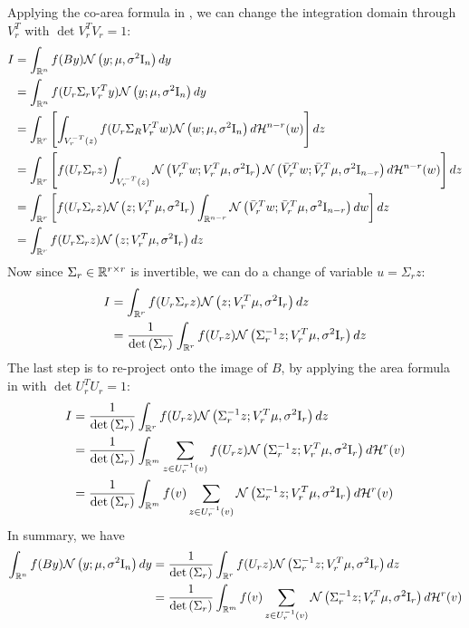 \documentclass[a4paper,10pt]{article}
\begin{document}
Applying the co-area formula in , we can change the integration domain through $V_r^T$ with $\det{V_r^T V_r} = 1$: 
\begin{align*}
    I &= \int_{\mathbb{R}^n} f(B y) \mathcal{N}\left( {y; \mu, \sigma^2 \mathrm{I}_n} \right) dy 
    \\&= \int_{\mathbb{R}^n} f(U_r \Sigma_r V_r^T y) \mathcal{N}\left( {y; \mu, \sigma^2 \mathrm{I}_n} \right) dy 
    \\&= \int_{\mathbb{R}^r} \left[ \int_{V_r^{-T}(z)} f(U_r \Sigma_R V_r^T w) \mathcal{N}\left( {w; \mu, \sigma^2 \mathrm{I}_n} \right) d\mathcal{H}^{n - r}(w)\right] dz
    \\&= \int_{\mathbb{R}^r} \left[ f(U_r \Sigma_r z) \int_{V_r^{-T}(z)} \mathcal{N}\left( {V_r^T w; V_r^T \mu, \sigma^2 \mathrm{I}_r} \right) \mathcal{N}\left( {\bar{V}_r^T w; \bar{V}_r^T \mu, \sigma^2 \mathrm{I}_{n-r}} \right) d \mathcal{H}^{n - r}(w)\right] dz
    \\&= \int_{\mathbb{R}^r} \left[ f(U_r \Sigma_r z) \mathcal{N}\left( {z; V_r^T \mu, \sigma^2 \mathrm{I}_r} \right) \int_{\mathbb{R}^{n - r}}  \mathcal{N}\left( {\bar{V}_r^T w; \bar{V}_r^T \mu, \sigma^2 \mathrm{I}_{n-r}} \right) dw \right] dz
    \\&= \int_{\mathbb{R}^r}f(U_r \Sigma_r z) \mathcal{N}\left( {z; V_r^T \mu, \sigma^2 \mathrm{I}_r} \right) dz
\end{align*}
Now since $\Sigma_r \in \mathbb{R}^{r \times r}$ is invertible, we can do a change of variable $u = \Sigma_r z$: 
\begin{align*}
    I &= \int_{\mathbb{R}^r}f(U_r \Sigma_r z) \mathcal{N}\left( {z; V_r^T \mu, \sigma^2 \mathrm{I}_r} \right) dz
    \\&= \frac{1}{\mathrm{det}\left( \Sigma_r \right)} \int_{\mathbb{R}^r}f(U_r z) \mathcal{N}\left( {\Sigma_r^{-1} z; V_r^T \mu, \sigma^2 \mathrm{I}_r} \right) dz
\end{align*}
The last step is to re-project onto the image of $B$, by applying the area formula in  with $\det{U_r^T U_r} = 1$: 
\begin{align*}
    I &= \frac{1}{\mathrm{det}\left( \Sigma_r \right)} \int_{\mathbb{R}^r} f(U_r z) \mathcal{N}\left( {\Sigma_r^{-1} z; V_r^T \mu, \sigma^2 \mathrm{I}_r} \right) dz
    \\&=  \frac{1}{\mathrm{det}\left( \Sigma_r \right)} \int_{\mathbb{R}^{m}} \sum_{z \in U_r^{-1}(v) } f(U_r z) \mathcal{N}\left( {\Sigma_r^{-1} z; V_r^T \mu, \sigma^2 \mathrm{I}_r} \right) d \mathcal{H}^{r}(v)
    \\&=  \frac{1}{\mathrm{det}\left( \Sigma_r \right)} \int_{\mathbb{R}^{m}} f(v) \sum_{z \in U_r^{-1}(v) } \mathcal{N}\left( {\Sigma_r^{-1} z; V_r^T \mu, \sigma^2 \mathrm{I}_r} \right) d \mathcal{H}^{r}(v)
\end{align*}
In summary, we have 
    \begin{align}\label{eq:key_equation}
        \int_{\mathbb{R}^n} f(B y) \mathcal{N}\left( {y; \mu, \sigma^2 \mathrm{I}_n} \right) dy 
        &= \frac{1}{\mathrm{det}\left( \Sigma_r \right)} \int_{\mathbb{R}^r}f(U_r z) \mathcal{N}\left( {\Sigma_r^{-1} z; V_r^T \mu, \sigma^2 \mathrm{I}_r} \right) dz
        \\&= \frac{1}{\mathrm{det}\left( \Sigma_r \right)} \int_{\mathbb{R}^{m}} f(v) \sum_{z \in U_r^{-1}(v) } \mathcal{N}\left( {\Sigma_r^{-1} z; V_r^T \mu, \sigma^2 \mathrm{I}_r} \right) d \mathcal{H}^{r}(v)
    \end{align}
\end{document}
